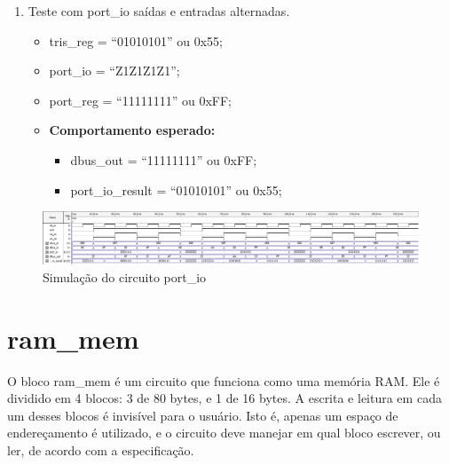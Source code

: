 \documentclass{article}
\begin{document}
\begin{enumerate}
    \item Teste com port\_io saídas e entradas alternadas.
    \begin{itemize}
        \item tris\_reg = ``01010101'' ou 0x55;
        \item port\_io  = ``Z1Z1Z1Z1'';
        \item port\_reg = ``11111111'' ou 0xFF;
        \item \textbf{Comportamento esperado:}
        \begin{itemize}
            \item dbus\_out = ``11111111'' ou 0xFF;
            \item port\_io\_result =  ``01010101'' ou 0x55;
        \end{itemize}
    \end{itemize}
\end{enumerate}

\begin{figure}[ht]
\begin{center}
    \includegraphics[width=15cm]{images/sim-port-io.png}
    \caption{Simulação do circuito port\_io}
\end{center}
\end{figure}

\newpage

\section{ram\_mem}

O bloco ram\_mem é um circuito que funciona como uma memória RAM. Ele é dividido em 4 blocos: 3 de 80 bytes, e 1 de 16 bytes. A escrita e leitura em cada um desses blocos é invisível para o usuário. Isto é, apenas um espaço de endereçamento é utilizado, e o circuito deve manejar em qual bloco escrever, ou ler, de acordo com a especificação.
\end{document}
